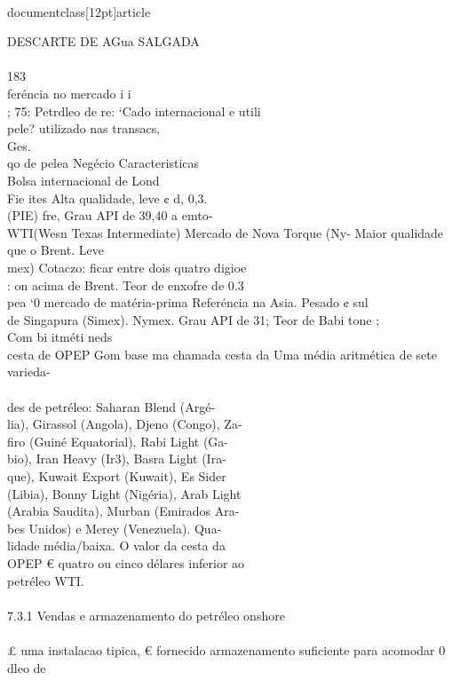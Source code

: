 \\documentclass[12pt]{article}
\begin{document}
DESCARTE DE AGua SALGADA\\
\\
183\\
feréncia no mercado i i\\
; 75: Petrdleo de re: ‘Cado internacional e utili\\
pele? utilizado nas transacs,\\
Ges.\\
qo de pelea Negécio Caracteristicas\\
Bolsa internacional de Lond\\
Fie ites Alta qualidade, leve ¢ d, 0,3.\\
(PIE) fre, Grau API de 39,40 a emto-\\
WTI(Wesn Texas Intermediate) Mercado de Nova Torque (Ny- Maior qualidade que o Brent. Leve\\
mex) Cotaczo: ficar entre dois quatro digioe\\
: on acima de Brent. Teor de enxofre de 0.3\\%
pea ‘0 mercado de matéria-prima Referéncia na Asia. Pesado ¢ sul\\
de Singapura (Simex). Nymex. Grau API de 31; Teor de Babi tone ;\\
Com bi itméti neds\\
cesta de OPEP Gom base ma chamada cesta da Uma média aritmética de sete varieda-\\
\\
des de petréleo: Saharan Blend (Argé-\\
lia), Girassol (Angola), Djeno (Congo), Za-\\
firo (Guiné Equatorial), Rabi Light (Ga-\\
bio), Iran Heavy (Ir3), Basra Light (Ira-\\
que), Kuwait Export (Kuwait), Es Sider\\
(Libia), Bonny Light (Nigéria), Arab Light\\
(Arabia Saudita), Murban (Emirados Ara-\\
bes Unidos) e Merey (Venezuela). Qua-\\
lidade média/baixa. O valor da cesta da\\
OPEP € quatro ou cinco délares inferior ao\\
petréleo WTI.\\
\\
7.3.1 Vendas e armazenamento do petréleo onshore\\
\\
£ uma instalacao tipica, € fornecido armazenamento suficiente para acomodar 0 dleo de\\
\end{document}
